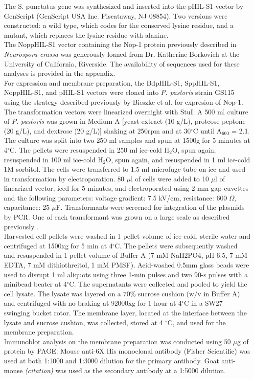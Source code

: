 \indent The S. punctatus gene was synthesized and inserted into the pHIL-S1 vector by GenScript (GenScript USA Inc. Piscataway, NJ 08854). Two versions were constructed: a wild type, which codes for the conserved lysine residue, and a mutant, which replaces the lysine residue with alanine.  \\
\indent The NoppHIL-S1 vector containing the Nop-1 protein previously described in \textit{Neurospora crassa} \cite{Bieszke1999} was generously loaned from Dr. Katherine Borkovich at the University of California, Riverside. The availability of sequences used for these analyses is provided in the appendix.\\
\indent For expression and membrane preparation, the BdpHIL-S1, SppHIL-S1, NoppHIL-S1, and pHIL-S1 vectors were cloned into \textit{P. pastoris} strain GS115 using the strategy described previously by Bieszke et al. \nocite{Bieszke1999} for expresion of Nop-1. The transformation vectors were linearized overnight with StuI. A 500 ml culture of \textit{P. pastoris} was grown in Medium A [yeast extract (10 g/L), proteose peptone (20 g/L), and dextrose (20 g/L)] shaking at 250rpm and at 30$^{\circ}$C until A$_{600}$ = 2.1. The culture was split into two 250 ml samples and spun at 1500g for 5 minutes at 4$^{\circ}$C. The pellets were resuspended in 250 ml ice-cold H$_{2}$O, spun again, resuspended in 100 ml ice-cold H$_{2}$O, spun again, and resuspended in 1 ml ice-cold 1M sorbitol. The cells were transferred to 1.5 ml microfuge tube on ice and used in transformation by electroporation. 80 $\mu$l of cells were added to 10 $\mu$l of linearized vector, iced for 5 minutes, and electroporated using 2 mm gap cuvettes and the following parameters: voltage gradient: 7.5 kV/cm, resistance: 600 $\Omega$, capacitance: 25 $\mu$F. Transformants were screened for integration of the plasmids by PCR. One of each transformant was grown on a large scale as described previously \cite{Bieszke1999}.\\
\indent Harvested cell pellets were washed in 1 pellet volume of ice-cold, sterile water and centrifuged at 1500xg for 5 min at 4$^{\circ}$C. The pellets were subsequently washed and resuspended in 1 pellet volume of Buffer A (7 mM NaH2PO4, pH 6.5, 7 mM EDTA, 7 mM dithiothreitol, 1 mM PMSF). Acid-washed 0.5mm glass beads were used to disrupt 1 ml aliquots using three 1-min pulses and two 90-s pulses with a minibead beater at 4$^{\circ}$C. The supernatants were collected and pooled to yield the cell lysate. The lysate was layered on a 70\% sucrose cushion (w/v in Buffer A) and centrifuged with no braking at 92000xg for 1 hour at 4$^{\circ}$C in a SW27 swinging bucket rotor.  The membrane layer, located at the interface between the lysate and sucrose cushion, was collected, stored at 4 $^{\circ}$C, and used for the membrane preparation.\\
\indent Immunoblot analysis on the membrane preparation was conducted using 50 $\mu$g of protein by PAGE. Mouse anti-6X His monoclonal antibody (Fisher Scientific) was used at both 1:1000 and 1:3000 dilution for the primary antibody. Goat anti-mouse \emph{(citation)} was used as the secondary antibody at a 1:5000 dilution.\\

